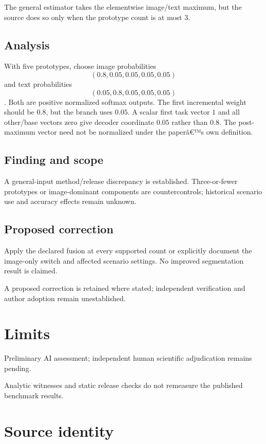 \documentclass[11pt]{article}
\begin{document}
The general estimator takes the elementwise image/text maximum, but the source does so only when the prototype count is at most \(3\).

\subsection*{Analysis}

With five prototypes, choose image probabilities \[(0.8,0.05,0.05,0.05,0.05)\] and text probabilities \[(0.05,0.8,0.05,0.05,0.05)\]. Both are positive normalized softmax outputs. The first incremental weight should be \(0.8\), but the branch uses \(0.05\). A scalar first task vector \(1\) and all other/base vectors zero give decoder coordinate \(0.05\) rather than \(0.8\). The post-maximum vector need not be normalized under the paperâ€™s own definition.

\subsection*{Finding and scope}

A general-input method/release discrepancy is established. Three-or-fewer prototypes or image-dominant components are countercontrols; historical scenario use and accuracy effects remain unknown.

\subsection*{Proposed correction}

Apply the declared fusion at every supported count or explicitly document the image-only switch and affected scenario settings. No improved segmentation result is claimed.

A proposed correction is retained where stated; independent verification and author adoption remain unestablished.

\section*{Limits}

Preliminary AI assessment; independent human scientific adjudication remains pending.\par

Analytic witnesses and static release checks do not remeasure the published benchmark results.\par

\section*{Source identity}
\end{document}
